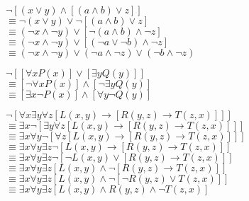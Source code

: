 \documentclass[12pt]{exam}
\begin{document}
\begin{solution}
\begin{qparts}
    \item $\lnot [(x \lor y) \land [(a \land b) \lor z]]$ \\
      $\equiv \lnot (x \lor y) \lor \lnot [(a \land b ) \lor z]$\\
      $\equiv (\lnot x \land \lnot y)\lor [\lnot (a \land b) \land \lnot z]$ \\
      $\equiv (\lnot x \land \lnot y) \lor [(\lnot a \lor \lnot b) \land \lnot z]$ \\
$\equiv (\lnot x \land \lnot y) \lor (\lnot a \land \lnot z) \lor (\lnot b \land \lnot z)$
     
    \item $\lnot [\left[ \forall x P(x) \right] \lor \left[ \exists y Q(y)\right]]$ \\
     $\equiv [\lnot \forall x P(x)] \land [\lnot \exists y Q(y)]$ \\
     $\equiv [\exists x \lnot P(x)] \land [\forall y \lnot Q(y)]$
    
    \item $\lnot[\forall x \exists y \forall z[ L(x,y) \rightarrow [R(y, z) \rightarrow T(z, x)]]]$ \\ $\equiv \exists x \lnot[\exists y \forall z[ L(x,y) \rightarrow [R(y, z) \rightarrow T(z, x)]]]$ \\
    $\equiv \exists x \forall y \lnot[\forall z[ L(x,y) \rightarrow [R(y, z) \rightarrow T(z, x)]]]$ \\
$\equiv \exists x \forall y \exists z \lnot[ L(x,y) \rightarrow [R(y, z) \rightarrow T(z, x)]]$ \\
    $\equiv \exists x \forall y \exists z \lnot[ \lnot L(x,y) \lor [R(y, z) \rightarrow T(z, x)]]$ \\
    $\equiv \exists x \forall y \exists z [ L(x,y) \land \lnot [R(y, z) \rightarrow T(z, x)]]$ \\
    $\equiv \exists x \forall y \exists z [ L(x,y) \land \lnot [ \lnot R(y, z) \lor T(z, x)]]$ \\
    $\equiv \exists x \forall y \exists z [ L(x,y) \land  R(y, z) \land \lnot T(z, x)]$
\end{qparts}
\end{solution}
\end{document}
